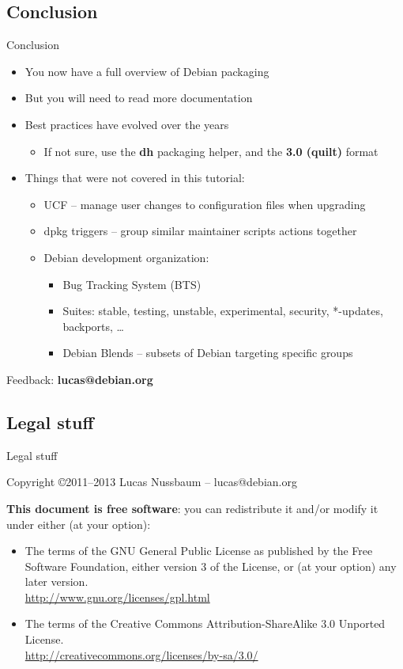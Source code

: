 \documentclass[10pt,final]{beamer}
\begin{document}
\subsection{Conclusion}
\begin{frame}{Conclusion}
  \begin{itemize}
  \item You now have a full overview of Debian packaging
    \br
  \item But you will need to read more documentation
    \br
  \item Best practices have evolved over the years
    \begin{itemize}
    \item If not sure, use the \textbf{dh} packaging helper, and the \textbf{3.0 (quilt)} format
    \end{itemize}
    \br
  \item Things that were not covered in this tutorial:
    \begin{itemize}
	\item UCF -- manage user changes to configuration files when upgrading
		\hbr
	\item dpkg triggers -- group similar maintainer scripts actions together
		\hbr
	\item Debian development organization:
		\begin{itemize}
			\item Bug Tracking System (BTS)
			\item Suites: stable, testing, unstable, experimental, security, *-updates, backports, \ldots
			\item Debian Blends -- subsets of Debian targeting specific groups
		\end{itemize}
		\end{itemize}
  \end{itemize}
  \vfill
  \centerline{\large Feedback: \textbf{lucas@debian.org}}
\end{frame}

\subsection{Legal stuff}
\begin{frame}{Legal stuff}

  Copyright \copyright 2011--2013 Lucas Nussbaum -- lucas@debian.org
  \br

  {\small 
    \textbf{This document is free software}: you can redistribute it and/or modify
    it under either (at your option):
    \hbr
    \begin{itemize}
    \item The terms of the GNU General Public License as published by the Free
      Software Foundation, either version 3 of the License, or
      (at your option) any later version.\\
      \url{http://www.gnu.org/licenses/gpl.html} \br
    \item The terms of the Creative Commons Attribution-ShareAlike 3.0 Unported
      License.\\ 
      \url{http://creativecommons.org/licenses/by-sa/3.0/}
    \end{itemize}
  }
\end{frame}
\end{document}
